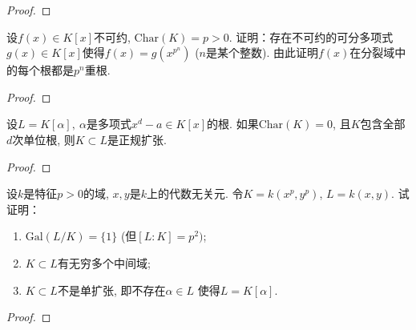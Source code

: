 \begin{proof}
    
\end{proof}

\begin{problem}
    设$f(x) \in K[x]$不可约, $\mathrm{Char}(K) = p > 0$.
证明：存在不可约的可分多项式$g(x) \in K[x]$使得$f(x) = g(x^{p^n})$
($n$是某个整数). 由此证明$f(x)$在分裂域中的每个根都是$p^n$重根.
\end{problem}

\begin{proof}
    
\end{proof}

\begin{problem}
    设$L = K[\alpha],~\alpha$是多项式$x^d - a \in K[x]$的根.
如果$\mathrm{Char}(K) = 0$,
且$K$包含全部$d$次单位根, 则$K \subset L$是正规扩张.
\end{problem}

\begin{proof}
    
\end{proof}

\begin{problem}
    设$k$是特征$p > 0$的域, $x, y$是$k$上的代数无关元.
令$K = k(x^p, y^p)$, $L = k(x, y)$. 试证明：
\begin{enumerate}[(1)]
    \item $\mathrm{Gal}(L/K) = \{1\}$ (但$[L:K] = p^2)$;
    \item $K \subset L$有无穷多个中间域;
    \item $K \subset L$不是单扩张, 即不存在$\alpha \in L$
使得$L = K[\alpha]$.
\end{enumerate}
\end{problem}

\begin{proof}
    
\end{proof}